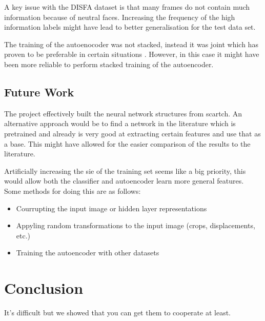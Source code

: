     A key issue with the DISFA dataset is that many frames do not contain much information
    because of neutral faces. Increasing the frequency of the high information labels
    might have lead to better generalisation for the test data set.

    The training of the autoenocoder was not stacked, instead it was joint which has
    proven to be preferable in certain situations \cite{Zhou2014}. However, in this case
    it might have been more reliable to perform stacked training of the autoencoder.

  \section{Future Work}
    The project effectively built the neural network structures from scartch.
    An alternative approach would be to find a network in the literature which is pretrained
    and already is very good at extracting certain features and use that as a base.
    This might have allowed for the easier comparison of the results to the literature.

    Artificially increasing the sie of the training set seems like a big priority,
    this would allow both the classifier and autoencoder learn more general features.
    Some methods for doing this are as follows:

    \begin{itemize}
      \item Courrupting the input image or hidden layer representations
      \item Appyling random transformations to the input image (crops, displacements, etc.)
      \item Training the autoencoder with other datasets
    \end{itemize}


\chapter{Conclusion}
  It's difficult but we showed that you can get them to cooperate at least.
